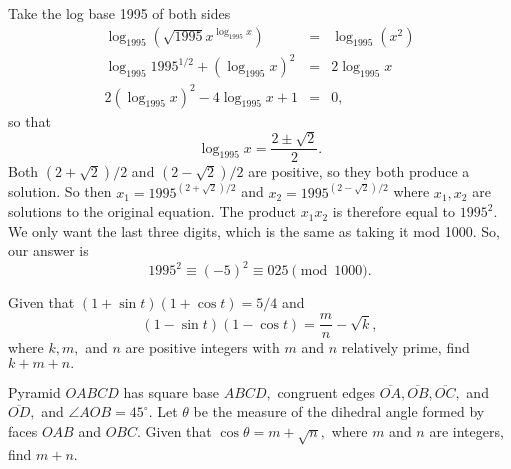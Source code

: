 \documentclass[11pt]{article}
\theoremstyle{definition}
\begin{document}
\begin{solution}[name={Solution by joml88}]
	Take the log base 1995 of both sides
	\begin{eqnarray*} \log_{1995}\left(\sqrt{1995}x^{\log_{1995}x}\right) &=& \log_{1995}(x^2)\\ \log_{1995}1995^{1/2}+(\log_{1995}x)^2 &=& 2\log_{1995}x\\ 2(\log_{1995}x)^2-4\log_{1995}x+1 &=& 0, \end{eqnarray*}
	so that $$\log_{1995}x=\frac{2\pm \sqrt{2}}2.$$
	Both $(2+\sqrt{2})/2$ and $(2-\sqrt{2})/2$ are positive, so they both produce a solution. So then $x_1=1995^{(2+\sqrt{2})/2}$ and $x_2=1995^{(2-\sqrt{2})/2}$ where $x_1, x_2$ are solutions to the original equation. The product $x_1x_2$ is therefore equal to $1995^2.$ We only want the last three digits, which is the same as taking it mod 1000. So, our answer is $$1995^2\equiv (-5)^2\equiv \boxed{025}\pmod{1000}.$$
\end{solution}










\begin{question}[name={1995 AIME, \href{https://artofproblemsolving.com/community/c4p394507}{Problem 7}}]
	Given that $(1+\sin t)(1+\cos t)=5/4$ and\[ (1-\sin t)(1-\cos t)=\frac mn-\sqrt{k}, \]where $k, m,$ and $n$ are positive integers with $m$ and $n$ relatively prime, find $k+m+n.$
\end{question}


%	













\begin{question}[name={1995 AIME, \href{https://artofproblemsolving.com/community/c4p394525}{Problem 12}}]
	Pyramid $OABCD$ has square base $ABCD,$ congruent edges $\overline{OA}, \overline{OB}, \overline{OC},$ and $\overline{OD},$ and $\angle AOB=45^\circ.$ Let $\theta$ be the measure of the dihedral angle formed by faces $OAB$ and $OBC.$ Given that $\cos \theta=m+\sqrt{n},$ where $m$ and $n$ are integers, find $m+n.$	
\end{question}
\end{document}

